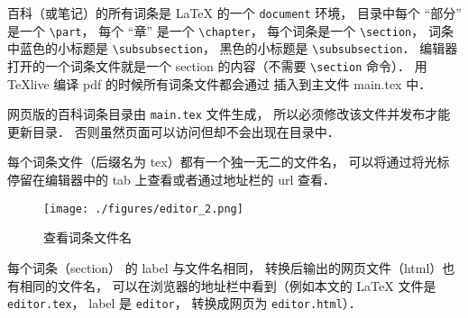 百科（或笔记）的所有词条是 LaTeX 的一个 \verb|document| 环境， 目录中每个 “部分” 是一个 \verb|\part|， 每个 “章” 是一个 \verb|\chapter|， 每个词条是一个 \verb|\section|， 词条中蓝色的小标题是 \verb|\subsubsection|， 黑色的小标题是 \verb|\subsubsection|． 编辑器打开的一个词条文件就是一个 section 的内容（不需要 \verb|\section| 命令）． 用 TeXlive 编译 pdf 的时候所有词条文件都会通过 \verb|| 插入到主文件 main.tex 中．

网页版的百科词条目录由 \verb|main.tex| 文件生成， 所以必须修改该文件并发布才能更新目录． 否则虽然页面可以访问但却不会出现在目录中．

每个词条文件（后缀名为 tex）都有一个独一无二的文件名， 可以将通过将光标停留在编辑器中的 tab 上查看或者通过地址栏的 url 查看．

\begin{figure}[ht]
\centering
\texttt{[image: ./figures/editor\_2.png]}
\caption{查看词条文件名} \label{editor_fig2}
\end{figure}

每个词条（section） 的 label 与文件名相同， 转换后输出的网页文件（html）也有相同的文件名， 可以在浏览器的地址栏中看到（例如本文的 LaTeX 文件是 \verb|editor.tex|， label 是 \verb|editor|， 转换成网页为 \verb|editor.html|）．

